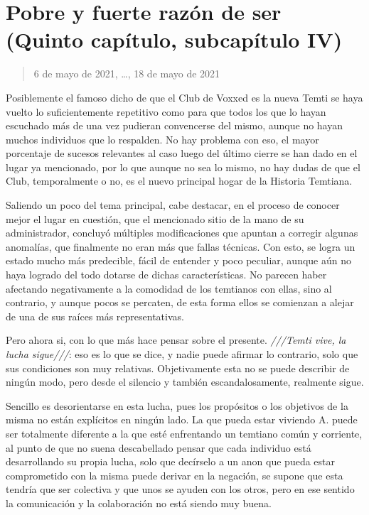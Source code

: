 \documentclass[
  spanish,
]{book}
\begin{document}
\hypertarget{pobre-y-fuerte-razuxf3n-de-ser-quinto-capuxedtulo-subcapuxedtulo-iv}{%
\section{Pobre y fuerte razón de ser (Quinto capítulo, subcapítulo IV)}\label{pobre-y-fuerte-razuxf3n-de-ser-quinto-capuxedtulo-subcapuxedtulo-iv}}

\begin{quote}
6 de mayo de 2021, \ldots, 18 de mayo de 2021
\end{quote}

Posiblemente el famoso dicho de que el Club de Voxxed es la nueva Temti se haya vuelto lo suficientemente repetitivo como para que todos los que lo hayan escuchado más de una vez pudieran convencerse del mismo, aunque no hayan muchos individuos que lo respalden. No hay problema con eso, el mayor porcentaje de sucesos relevantes al caso luego del último cierre se han dado en el lugar ya mencionado, por lo que aunque no sea lo mismo, no hay dudas de que el Club, temporalmente o no, es el nuevo principal hogar de la Historia Temtiana.

Saliendo un poco del tema principal, cabe destacar, en el proceso de conocer mejor el lugar en cuestión, que el mencionado sitio de la mano de su administrador, concluyó múltiples modificaciones que apuntan a corregir algunas anomalías, que finalmente no eran más que fallas técnicas. Con esto, se logra un estado mucho más predecible, fácil de entender y poco peculiar, aunque aún no haya logrado del todo dotarse de dichas características. No parecen haber afectando negativamente a la comodidad de los temtianos con ellas, sino al contrario, y aunque pocos se percaten, de esta forma ellos se comienzan a alejar de una de sus raíces más representativas.

Pero ahora si, con lo que más hace pensar sobre el presente. \emph{///Temti vive, la lucha sigue///}: eso es lo que se dice, y nadie puede afirmar lo contrario, solo que sus condiciones son muy relativas. Objetivamente esta no se puede describir de ningún modo, pero desde el silencio y también escandalosamente, realmente sigue.

Sencillo es desorientarse en esta lucha, pues los propósitos o los objetivos de la misma no están explícitos en ningún lado. La que pueda estar viviendo A. puede ser totalmente diferente a la que esté enfrentando un temtiano común y corriente, al punto de que no suena descabellado pensar que cada individuo está desarrollando su propia lucha, solo que decírselo a un anon que pueda estar comprometido con la misma puede derivar en la negación, se supone que esta tendría que ser colectiva y que unos se ayuden con los otros, pero en ese sentido la comunicación y la colaboración no está siendo muy buena.
\end{document}

